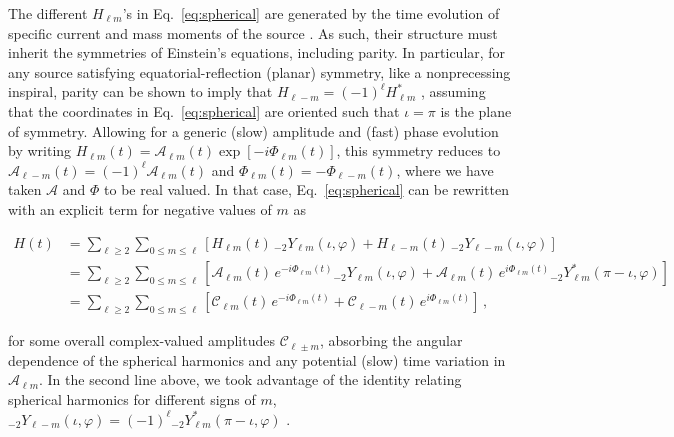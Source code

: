\documentclass[aps,prd,twocolumn,superscriptaddress,preprintnumbers,floatfix,nofootinbib]{revtex4-2}
\newcommand*{\eq}[1]{Eq.~\eqref{eq:#1}}
\begin{document}
The different $H_{\ell m}$'s in \eq{spherical} are generated by the time evolution of specific current and mass moments of the source \cite{Thorne:1980ru}.
As such, their structure must inherit the symmetries of Einstein's equations, including parity.
In particular, for any source satisfying equatorial-reflection (planar) symmetry, like a nonprecessing inspiral, parity can be shown to imply that $H_{\ell -m} = (-1)^\ell H_{\ell m}^*$ \cite{Faye:2012we}, assuming that the coordinates in \eq{spherical} are oriented such that $\iota=\pi$ is the plane of symmetry.
Allowing for a generic (slow) amplitude and (fast) phase evolution by writing $H_{\ell m}(t) = \mathcal{A}_{\ell m}(t) \exp[-i \Phi_{\ell m}(t)]$, this symmetry reduces to $\mathcal{A}_{\ell -m}(t) = (-1)^\ell \mathcal{A}_{\ell m}(t)$ and $\Phi_{\ell m}(t) = - \Phi_{\ell -m}(t)$, where we have taken $\mathcal{A}$ and $\Phi$ to be real valued.
In that case, \eq{spherical} can be rewritten with an explicit term for negative values of $m$ as
\begin{widetext}
\begin{subequations} \label{eq:spherical_modes}
\begin{align}
H(t) &= \sum_{\ell \geq 2} \sum_{0\leq m \leq \ell} \left[H_{\ell m}(t)\, {}_{-2}Y_{\ell m} (\iota, \varphi) + H_{\ell -m}(t)\, {}_{-2}Y_{\ell -m} (\iota, \varphi) \right] \\
&= \sum_{\ell \geq 2} \sum_{0\leq m \leq \ell} \left[\mathcal{A}_{\ell m}(t)\, e^{-i\Phi_{\ell m} (t)} {}_{-2}Y_{\ell m}(\iota, \varphi) +  \mathcal{A}_{\ell m}(t)\, e^{i\Phi_{\ell m} (t)} {}_{-2}Y_{\ell m}^*(\pi-\iota, \varphi) \right] \\
&= \sum_{\ell \geq 2} \sum_{0\leq m \leq \ell} \left[\mathcal{C}_{\ell m}(t)\, e^{-i\Phi_{\ell m} (t)}  +  \mathcal{C}_{\ell -m}(t)\, e^{i\Phi_{\ell m} (t)} \right]\, ,
\end{align}
\end{subequations}
\end{widetext}
for some overall complex-valued amplitudes $\mathcal{C}_{\ell \pm m}$, absorbing the angular dependence of the spherical harmonics and any potential (slow) time variation in $\mathcal{A}_{\ell m}$.
In the second line above, we took advantage of the identity relating spherical harmonics for different signs of $m$, ${}_{-2} Y_{\ell -m}(\iota,\varphi) = (-1)^{\ell} {}_{-2} Y_{\ell m}^*(\pi-\iota,\varphi)$ \cite{goldberg:1967}.
\end{document}

